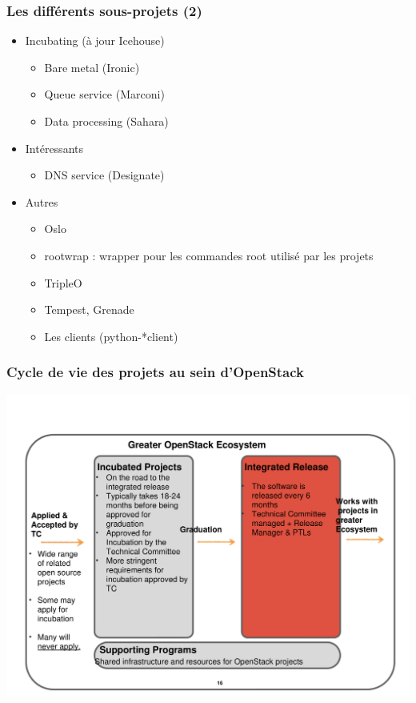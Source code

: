   \begin{frame}
    \frametitle{Les différents sous-projets (2)}
    \begin{itemize}
      \item Incubating (à jour Icehouse)
      \begin{itemize}
        \item Bare metal (Ironic)
        \item Queue service (Marconi)
        \item Data processing (Sahara)
      \end{itemize}\pause
      \item Intéressants
      \begin{itemize}
        \item DNS service (Designate)
      \end{itemize}
      \item Autres\pause
      \begin{itemize}
        \item Oslo
        \item rootwrap : wrapper pour les commandes root utilisé par les projets
        \item TripleO
        \item Tempest, Grenade
        \item Les clients (python-*client)
      \end{itemize}
    \end{itemize}
  \end{frame}

  \begin{frame}
    \frametitle{Cycle de vie des projets au sein d'OpenStack}
    \includegraphics[width=\textwidth]{images/innovation1.pdf}
  \end{frame}

